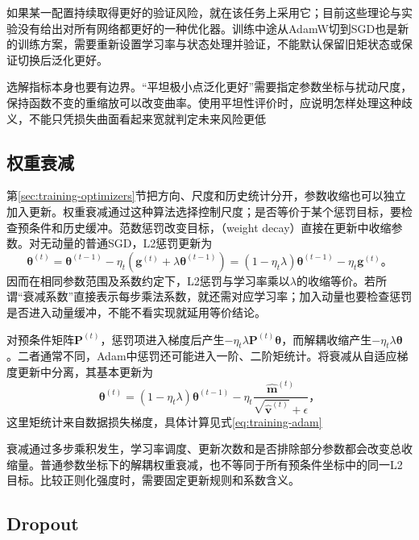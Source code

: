 如果某一配置持续取得更好的验证风险，就在该任务上采用它；目前这些理论与实验没有给出对所有网络都更好的一种优化器。训练中途从AdamW切到SGD也是新的训练方案，需要重新设置学习率与状态处理并验证，不能默认保留旧矩状态或保证切换后泛化更好。

选解指标本身也要有边界。“平坦极小点泛化更好”需要指定参数坐标与扰动尺度，保持函数不变的重缩放可以改变曲率。使用平坦性评价时，应说明怎样处理这种歧义，不能只凭损失曲面看起来宽就判定未来风险更低

\subsection{权重衰减}
\label{sec:generalization-weight-decay}

第\ref{sec:training-optimizers}节把方向、尺度和历史统计分开，参数收缩也可以独立加入更新。权重衰减通过这种算法选择控制尺度；是否等价于某个惩罚目标，要检查预条件和历史缓冲。范数惩罚改变目标，（weight decay）直接在更新中收缩参数。对无动量的普通SGD，L2惩罚更新为
\begin{equation}
  \bm\theta^{(t)}=\bm\theta^{(t-1)}-
    \eta_t(\bm g^{(t)}+\lambda\bm\theta^{(t-1)})
  =(1-\eta_t\lambda)\bm\theta^{(t-1)}-\eta_t\bm g^{(t)}\text{。}
  \label{eq:generalization-sgd-weight-decay}
\end{equation}
因而在相同参数范围及系数约定下，L2惩罚与学习率乘以$\lambda$的收缩等价。若所谓“衰减系数”直接表示每步乘法系数，就还需对应学习率；加入动量也要检查惩罚是否进入动量缓冲，不能不看实现就延用等价结论。

对预条件矩阵$\bm P^{(t)}$，惩罚项进入梯度后产生$-\eta_t\lambda\bm P^{(t)}\bm\theta$，而解耦收缩产生$-\eta_t\lambda\bm\theta$。二者通常不同，Adam中惩罚还可能进入一阶、二阶矩统计。将衰减从自适应梯度更新中分离，其基本更新为
\begin{equation}
  \bm\theta^{(t)}=(1-\eta_t\lambda)\bm\theta^{(t-1)}-
    \eta_t\frac{\hat{\bm m}^{(t)}}{\sqrt{\hat{\bm v}^{(t)}}+\epsilon}\text{，}
  \label{eq:generalization-adamw}
\end{equation}
这里矩统计来自数据损失梯度，具体计算见式\eqref{eq:training-adam}

衰减通过多步乘积发生，学习率调度、更新次数和是否排除部分参数都会改变总收缩量。普通参数坐标下的解耦权重衰减，也不等同于所有预条件坐标中的同一L2目标。比较正则化强度时，需要固定更新规则和系数含义。

\subsection{Dropout}
\label{sec:generalization-dropout}
\label{sec:generalization-stochastic-regularization}

